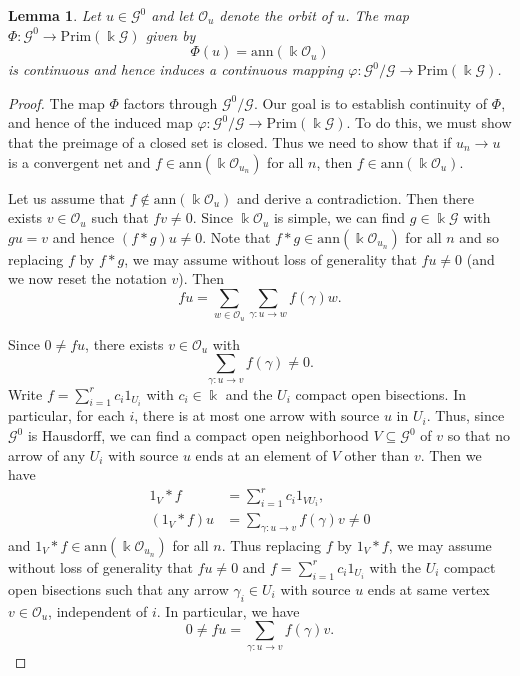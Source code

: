 \documentclass[11pt,reqno]{amsart}
\theoremstyle{plain}
\newtheorem{lem}[thm]{Lemma}
\numberwithin{equation}{section}
\newcommand{\prim}{\mathrm{Prim}}
\newcommand{\G}[0]{\mathscr{G}}
\newcommand{\orb}[0]{\mathcal{O}}
\begin{document}
\begin{lem}\label{l:orbit.cont}
Let $u\in \mathscr G^0$ and let $\orb_u$ denote the orbit of $u$. The map $\Phi\colon \mathscr G^0\to \prim(\Bbbk \mathscr G)$ given by
\[\Phi(u) = \mathrm{ann}(\Bbbk \orb_u)\]
 is continuous and hence induces a continuous mapping $\varphi\colon \G^0/\G\to \prim(\Bbbk\G)$.	
\end{lem}
\begin{proof}
The map $\Phi$ factors through $\mathscr G^0/\mathscr G$.  Our goal is to establish continuity of $\Phi$, and hence of the induced map $\varphi\colon \mathscr G^0/\mathscr G\to \prim(\Bbbk \mathscr G)$.  To do this, we must show that the preimage of a closed set is closed.  Thus we need to show that if $u_n\to u$ is a convergent net and $f\in \mathrm{ann}(\Bbbk \orb_{u_n})$ for all $n$, then $f\in \mathrm{ann}(\Bbbk \orb_u)$.

 Let us assume that $f\notin \mathrm{ann}(\Bbbk \orb_u)$ and derive a contradiction.  Then there exists $v\in \orb_u$ such that $fv\neq 0$.  Since $\Bbbk\orb_u$ is simple, we can find $g\in \Bbbk \mathscr G$ with $gu=v$ and hence $(f\ast g)u\neq 0$.  Note that $f\ast g\in \mathrm{ann}(\Bbbk \orb_{u_n})$ for all $n$ and so replacing $f$ by $f\ast g$, we may assume without loss of generality that $fu\neq 0$ (and we now reset the notation $v$).  Then
 \[fu = \sum_{w\in \orb_u}\sum_{\gamma\colon u\to w} f(\gamma)w.\]

 Since $0\neq fu$, there exists $v\in \orb_u$ with \[\sum_{\gamma\colon u\to v} f(\gamma)\neq 0.\]  Write $f=\sum_{i=1}^r c_i1_{U_i}$ with $c_i\in \Bbbk$ and the $U_i$ compact open bisections.  In particular, for each $i$, there is at most one arrow with source $u$ in $U_i$.  Thus,
since $\mathscr G^0$ is Hausdorff, we can find a compact open neighborhood $V\subseteq\mathscr G^0$ of $v$ so that no arrow of any $U_i$ with source $u$  ends at an element of $V$ other than $v$.    Then we have
\begin{align*}
1_V\ast f &= \sum_{i=1}^rc_i1_{VU_i},\\
(1_V\ast f)u  &= \sum_{\gamma\colon u\to v}f(\gamma)v\neq 0
\end{align*}
  and $1_V\ast f\in \mathrm{ann}(\Bbbk \orb_{u_n})$ for all $n$.  Thus replacing $f$ by $1_V\ast f$, we may assume without loss of generality that $fu\neq 0$ and $f=\sum_{i=1}^r c_i1_{U_i}$ with the $U_i$ compact open bisections such that any arrow $\gamma_i\in U_i$ with source $u$ ends at same vertex $v\in \orb_u$, independent of $i$.  In particular, we have \[0\neq fu =\sum_{\gamma\colon u\to v}f(\gamma)v.\]


\end{proof}
\end{document}
